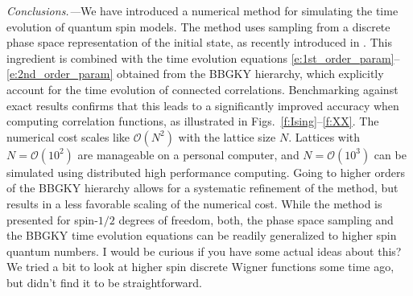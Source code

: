 \documentclass[aps,prl,showpacs,amsmath,amssymb,superscriptaddress,reprint,10pt]{revtex4-1}
\newcommand{\js}[1]{{\color{johannes} #1}}
\newcommand{\ar}[1]{{\color{analabha} #1}}
\begin{document}
\begin{bibunit}
{\em Conclusions.---}We have introduced a numerical method for simulating the time evolution of quantum spin models. The method uses sampling from a discrete phase space representation of the initial state, as recently introduced in \cite{Schachenmayer_etal15}. This ingredient is combined with the time evolution equations \eqref{e:1st_order_param}--\eqref{e:2nd_order_param} obtained from the BBGKY hierarchy, which explicitly account for the time evolution of connected correlations. Benchmarking against exact results confirms that this leads to a significantly improved accuracy when computing correlation functions, as illustrated in Figs.~\ref{f:Ising}--\ref{f:XX}. The numerical cost scales like $\mathscr{O}(N^2)$ with the lattice size $N$. \ar{Lattices with $N=\mathscr{O}(10^2)$ are manageable on a personal computer, and $N=\mathscr{O}(10^3)$ can be simulated using distributed high performance computing}. Going to higher orders of the BBGKY hierarchy allows for a systematic refinement of the method, but results in a less favorable 
scaling of the numerical cost. While 
the method is presented for spin-$1/2$ degrees of freedom, both, the phase space sampling and the BBGKY time evolution equations can be readily generalized to higher spin quantum numbers. \js{I would be curious if you have some actual ideas about this? We tried a bit to look at higher spin discrete Wigner functions some time ago, but didn’t find it to be straightforward.}


\end{bibunit}
\end{document}

